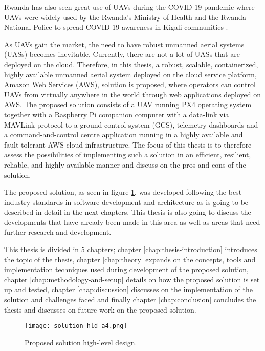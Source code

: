 Rwanda has also seen great use of UAVs during the COVID-19 pandemic where UAVs were widely used by the Rwanda’s Ministry of Health and the Rwanda National Police to spread COVID-19 awareness in Kigali communities \cite{whoafricarw2020}.

As UAVs gain the market, the need to have robust unmanned aerial systems (UASs) becomes inevitable. Currently, there are not a lot of UASs that are deployed on the cloud. Therefore, in this thesis, a robust, scalable, containerized, highly available unmanned aerial system deployed on the cloud service platform, Amazon Web Services (AWS), solution is proposed, where operators can control UAVs from virtually anywhere in the world through web applications deployed on AWS. The proposed solution consists of a UAV running PX4 operating system together with a Raspberry Pi companion computer with a data-link via MAVLink protocol to a ground control system (GCS), telemetry dashboards and a command-and-control centre application running in a highly available and fault-tolerant AWS cloud infrastructure. The focus of this thesis is to therefore assess the possibilities of implementing such a solution in an efficient, resilient, reliable, and highly available manner and discuss on the pros and cons of the solution.

The proposed solution, as seen in figure \ref{fig:solution-hld-a4}, was developed following the best industry standards in software development and architecture as is going to be described in detail in the next chapters. This thesis is also going to discuss the developments that have already been made in this area as well as areas that need further research and development.

This thesis is divided in 5 chapters; chapter \ref{chap:thesis-introduction} introduces the topic of the thesis, chapter \ref{chap:theory} expands on the concepts, tools and implementation techniques used during development of the proposed solution, chapter \ref{chap:methodology-and-setup} details on how the proposed solution is set up and tested, chapter \ref{chap:discussion} discusses on the implementation of the solution and challenges faced and finally chapter \ref{chap:conclusion} concludes the thesis and discusses on future work on the proposed solution.

\begin{figure}[!htbp]
    \centering \texttt{[image: solution\_hld\_a4.png]}
    \caption{Proposed solution high-level design.}
    \label{fig:solution-hld-a4}
\end{figure}


